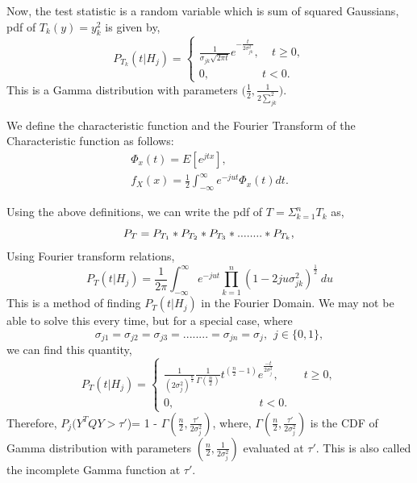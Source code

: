 \documentclass[a4paper,english,12pt]{article}
\begin{document}
Now, the test statistic is a random variable which is sum of squared Gaussians, pdf of $T_k(y)=y_k^2$ is given by,
\begin{equation}
 P_{T_k}\left({t}|{H_j}\right)=\begin{cases}
 	\frac{1}{\sigma_{jk}\sqrt{2\pi t}}e^{-\frac{t}{2\sigma_{jk}^2}}, \ \ \ \ \ t\ge0,\\
 	0, \ \ \ \ \ \ \ \ \ \ \ \ \ \ \ \ \ \ \ \ \  t<0.
 	\end{cases}
\end{equation}
This is a Gamma distribution with parameters $\bigg(\frac{1}{2},\frac{1}{2\sum_{jk}^2}\bigg)$.
\begin{defn}
We define the characteristic function and the Fourier Transform of the Characteristic function as follows:
\begin{align*}
\Phi_x(t) = E[e^{jtx}],\\
f_X(x)=\frac{1}{2}\int_{-\infty}^{\infty}e^{-jut}\Phi_x(t)dt.
\end{align*}
\end{defn} 
Using the above definitions, we can write the pdf of ${T=\Sigma_{k=1}^{n}T_k}$ as,
\begin{equation}
 P_T= P_{T_1}*P_{T_2}*P_{T_3}*........*P_{T_k},\\\nonumber
 \end{equation}
Using Fourier transform relations,
 \begin{equation}
P_T({t}|{H_j})=\frac{1}{2\pi}\int_{-\infty}^{\infty}e^{-jut}\prod_{k=1}^{n}\left(1-2ju\sigma_{jk}^2\right)^{\frac{1}{2}}~du
\end{equation}
This is a method of finding $P_T({t}|{H_j})$ in the Fourier Domain. We may not be able to solve this every time, but for a special case, where
\begin{equation}
 \sigma_{j1}=\sigma_{j2}=\sigma_{j3}=........=\sigma_{jn}=\sigma_{j}, \hspace{5pt}j\in\{0,1\},
\end{equation} 
we can find this quantity,
\begin{equation}
 P_T({t}|{H_j})=
 \begin{cases}
 	\frac{1}{(2\sigma_j^2)^\frac{n}{2}}\frac{1}{\Gamma(\frac{n}{2})}t^{(\frac{n}{2}-1)}e^\frac{-t}{2\sigma_j^2}, \ \ \ \ \ \ \ \ \ \ t\ge0,\\
 	0, \ \ \ \ \ \ \ \ \ \ \ \ \ \ \ \ \ \ \ \ \ \ \ \ \ \ \ \ \ \ \ \ \ \ t<0.
 	\end{cases}
\end{equation}
Therefore, $P_j(Y^TQY>\tau'$)= 1 - ${\Gamma}\left(\frac{n}{2},\frac{\tau'}{2\sigma_j^2}\right)$, where, ${\Gamma}\left(\frac{n}{2},\frac{\tau'}{2\sigma_j^2}\right)$ is the CDF of Gamma distribution with parameters $(\frac{n}{2},\frac{1}{2\sigma_j^2})$ evaluated at $\tau'$. This is also called the incomplete Gamma function at $\tau'$.
\end{document}
